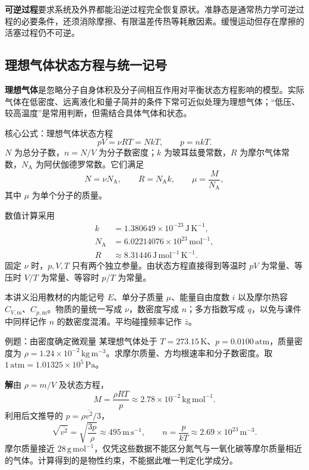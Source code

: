 \documentclass[UTF8,fontset=none,zihao=-4,a4paper]{ctexart}
\newcommand{\term}[1]{\textbf{#1}}
\newcommand{\unit}[1]{\,\mathrm{#1}}
\newcommand{\sol}{\par\noindent\textbf{解}\quad}
\begin{document}
\term{可逆过程}要求系统及外界都能沿逆过程完全恢复原状。准静态是通常热力学可逆过程的必要条件，还须消除摩擦、有限温差传热等耗散因素。缓慢运动但存在摩擦的活塞过程仍不可逆。

\subsection{理想气体状态方程与统一记号}
\term{理想气体}是忽略分子自身体积及分子间相互作用对平衡状态方程影响的模型。实际气体在低密度、远离液化和量子简并的条件下常可近似处理为理想气体；“低压、较高温度”是常用判断，但需结合具体气体和状态。
\begin{infobox}{核心公式：理想气体状态方程}
\[
 pV=\nu RT=NkT,\qquad p=nkT.
\]
$N$ 为总分子数，$n=N/V$ 为分子数密度；$k$ 为玻耳兹曼常数，$R$ 为摩尔气体常数，$N_{\mathrm A}$ 为阿伏伽德罗常数。它们满足
\[
 N=\nu N_{\mathrm A},\qquad R=N_{\mathrm A}k,\qquad \mu=\frac{M}{N_{\mathrm A}},
\]
其中 $\mu$ 为单个分子的质量。
\end{infobox}
数值计算采用
\begin{align*}
 k&=1.380649\times10^{-23}\unit{J\,K^{-1}},\\
 N_{\mathrm A}&=6.02214076\times10^{23}\unit{mol^{-1}},\\
 R&\approx8.31446\unit{J\,mol^{-1}\,K^{-1}}.
\end{align*}
固定 $\nu$ 时，$p,V,T$ 只有两个独立参量。由状态方程直接得到等温时 $pV$ 为常量、等压时 $V/T$ 为常量、等容时 $p/T$ 为常量。

本讲义沿用教材的内能记号 $E$、单分子质量 $\mu$、能量自由度数 $i$ 以及摩尔热容 $C_{V,\mathrm m}$、$C_{p,\mathrm m}$。物质的量统一写成 $\nu$，数密度写成 $n$；多方指数写成 $q$，以免与课件中同样记作 $n$ 的数密度混淆。平均碰撞频率记作 $\bar z$。

\begin{infobox}{例题：由密度确定微观量}
某理想气体处于 $T=273.15\unit K$、$p=0.0100\unit{atm}$，质量密度为 $\rho=1.24\times10^{-2}\unit{kg\,m^{-3}}$。求摩尔质量、方均根速率和分子数密度。取 $1\unit{atm}=1.01325\times10^5\unit{Pa}$。
\end{infobox}
\sol 由 $\rho=m/V$ 及状态方程，
\[
 M=\frac{\rho RT}{p}\approx2.78\times10^{-2}\unit{kg\,mol^{-1}}.
\]
利用后文推导的 $p=\rho\overline{v^2}/3$，
\[
 \sqrt{\overline{v^2}}=\sqrt{\frac{3p}{\rho}}\approx495\unit{m\,s^{-1}},\qquad
 n=\frac{p}{kT}\approx2.69\times10^{23}\unit{m^{-3}}.
\]
摩尔质量接近 $28\unit{g\,mol^{-1}}$，仅凭这些数据不能区分氮气与一氧化碳等摩尔质量相近的气体。计算得到的是物性约束，不能据此唯一判定化学成分。
\end{document}
